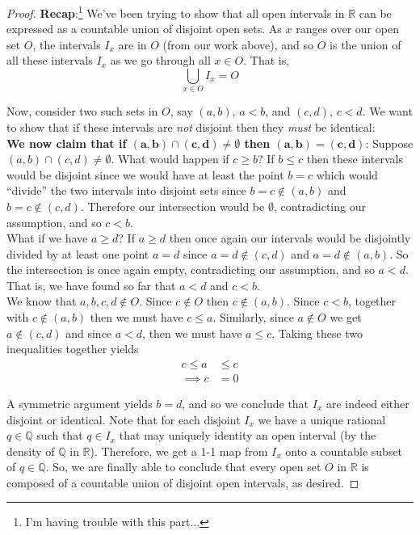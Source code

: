 \documentclass[12pt]{article}
\newlength\tindent
\renewcommand{\indent}{\hspace*{\tindent}}
\newcommand{\R}{\mathbb R}
\newcommand{\Q}{\mathbb Q}
\begin{document}
\begin{proof}
{\bf Recap}:\footnote{I'm having trouble with this part...} We've been trying to show that all open intervals in $\R$ can be expressed as a countable union of disjoint open sets. As $x$ ranges over our open set $O$, the intervals $I_x$ are in $O$ (from our work above), and so $O$ is the union of all these intervals $I_x$ as we go through all $x \in O$. That is,
\begin{equation*}
	\bigcup_{x \in O} I_x = O
\end{equation*}

\indent Now, consider two such sets in $O$, say $(a,b)$, $a < b$, and $(c,d)$, $c < d$. We want to show that if these intervals are {\em not} disjoint then they {\em must} be identical: \\

{\bf We now claim that if $\bm{(a,b)\cap(c,d)\neq\emptyset}$ then $\bm{(a,b)=(c,d)}$}: Suppose $(a,b)\cap(c,d)\neq\emptyset$. What would happen if $c \geq b$? If $b \leq c$ then these intervals would be disjoint since we would have at least the point $b = c$ which would ``divide'' the two intervals into disjoint sets since $b = c \notin (a,b)$ and $b = c \notin (c,d)$. Therefore our intersection would be $\emptyset$, contradicting our assumption, and so $c < b$. \\

\indent What if we have $a \geq d$? If $a \geq d$ then once again our intervals would be disjointly divided by at least one point $a = d$ since $a = d \notin (c,d)$ and $a = d \notin (a,b)$. So the intersection is once again empty, contradicting our assumption, and so $a < d$. \\

That is, we have found so far that $a < d$ and $c < b$. \\

\indent We know that $a,b,c,d \notin O$. Since $c \notin O$ then $c \notin (a,b)$. Since $c < b$, together with $c \notin (a,b)$ then we must have $c \leq a$. Similarly, since $a \notin O$ we get $a \notin (c,d)$ and since $a < d$, then we must have $a \leq c$. Taking these two inequalities together yields
\begin{align*}
	c \leq a &\leq c \\
	\implies c &= 0
\end{align*}

\indent A symmetric argument yields $b = d$, and so we conclude that $I_x$ are indeed either disjoint or identical. Note that for each disjoint $I_x$ we have a unique rational $q \in \Q$ such that $q \in I_x$ that may uniquely identity an open interval (by the density of $\Q$ in $\R$). Therefore, we get a 1-1 map from $I_x$ onto a countable subset of $q \in \Q$. So, we are finally able to conclude that every open set $O$ in $\R$ is composed of a countable union of disjoint open intervals, as desired.
\end{proof}
\end{document}
